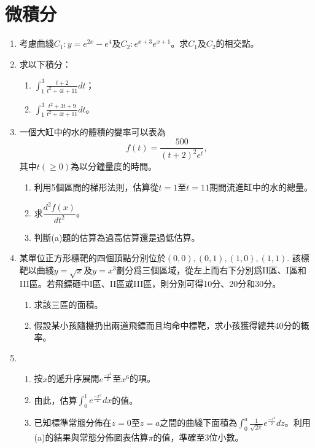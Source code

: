 \documentclass[12pt]{article}
\begin{document}
    \section{微積分}
    \begin{enumerate}
        \item 考慮曲綫$C_1:y=e^{2x}-e^4$及$C_2:e^{x+3}e^{x+1}$。求$C_1$及$C_2$的相交點。
        \item 求以下積分：\begin{enumerate}
            \item $\displaystyle\int_{1}^{3}\frac{t+2}{t^2+4t+11}dt$；
            \item $\displaystyle\int_{1}^{3}\frac{t^2+3t+9}{t^2+4t+11} dt$。
        \end{enumerate}
        \item 一個大缸中的水的體積的變率可以表為\[f(t)=\frac{500}{(t+2)^2e^t},\]其中$t(\geq 0)$為以分鐘量度的時間。\begin{enumerate}
            \item 利用5個區間的梯形法則，估算從$t=1$至$t=11$期間流進缸中的水的總量。
            \item 求$\dfrac{d^2 f(x)}{dt^2}$。
            \item 判斷(a)題的估算為過高估算還是過低估算。
        \end{enumerate}
        \item 某單位正方形標靶的四個頂點分別位於$(0,0), (0,1), (1,0), (1,1)$. 該標靶以曲綫$y=\sqrt{x}$及$y=x^3$劃分爲三個區域，從左上而右下分別爲II區、I區和III區。若飛鏢砸中I區、II區或III區，則分別可得10分、20分和30分。\begin{enumerate}
            \item 求該三區的面積。
            \item 假設某小孩隨機扔出兩道飛鏢而且均命中標靶，求小孩獲得總共40分的概率。
        \end{enumerate}
        \item \begin{enumerate}
            \item 按$x$的遞升序展開$e^{\frac{-x^2}{2}}$至$x^6$的項。
            \item 由此，估算$\displaystyle \int_{0}^{1} e^{\frac{-x^2}{2}}dx$的值。
            \item 已知標準常態分佈在$z=0$至$z=a$之間的曲綫下面積為$\displaystyle \int_{0}^{a} \frac{1}{\sqrt{2\pi}}e^{\frac{-z^2}{2}} dz$。利用(a)的結果與常態分佈圖表估算$\pi$的值，準確至3位小數。
        \end{enumerate}

\end{enumerate}
\end{document}
